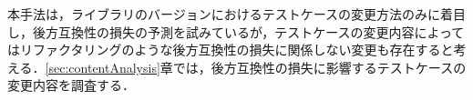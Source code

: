 \documentclass[submit]{ipsj}
\begin{document}
本手法は，ライブラリのバージョンにおけるテストケースの変更方法のみに着目し，後方互換性の損失の予測を試みているが，テストケースの変更内容によってはリファクタリングのような後方互換性の損失に関係しない変更も存在すると考える．\ref{sec:contentAnalysis}章では，後方互換性の損失に影響するテストケースの変更内容を調査する．



\begin{table}[t]
  \centering
  \caption{テストコード変更有無に基づく後方互換性損失の検出結果}
  \label{fig:result1}
  \vspace{-5mm}
\end{table}

\end{document}
